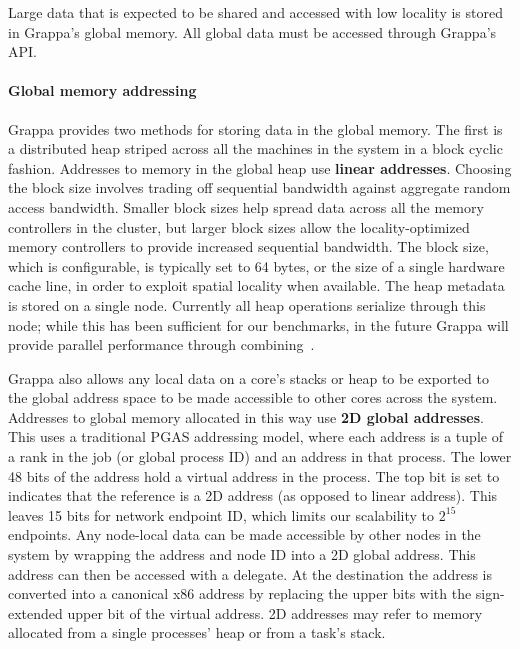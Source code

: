 Large data that is expected to be shared and accessed with low locality is stored in Grappa's global memory. All global data must be accessed through Grappa's API. %

\paragraph{Global memory addressing} Grappa provides two methods for storing data in the global memory. The first is a distributed heap striped across all the machines in the system in a block cyclic fashion.  Addresses to memory in the global heap use \textbf{linear addresses}.  Choosing the block size involves trading off sequential bandwidth against aggregate random access bandwidth. Smaller block sizes help spread data across all the memory controllers in the cluster, but larger block sizes allow the locality-optimized memory controllers to provide increased sequential bandwidth. The block size, which is configurable, is typically set to 64 bytes, or the size of a single hardware cache line, in order to exploit spatial locality when available. The heap metadata is stored on a single node. Currently all heap operations serialize through this node; while this has been sufficient for our benchmarks, in the future Grappa will provide parallel performance through combining~\cite{MAMA,flatcombining}.

Grappa also allows any local data on a core's stacks or heap to be exported to the global address space to be made accessible to other cores across the system. Addresses to global memory allocated in this way use \textbf{2D global addresses}.  This uses a traditional PGAS addressing model, where each address is a tuple of a rank in the job (or global process ID) and an address in that process. The lower 48 bits of the address hold a virtual address in the process. The top bit is set to indicates that the reference is a 2D address (as opposed to linear address). This leaves 15 bits for network endpoint ID, which limits our scalability to $2^{15}$ endpoints. Any node-local data can be made accessible by other nodes in the system by wrapping the address and node ID into a 2D global address. This address can then be accessed with a delegate.  At the destination the address is converted into a canonical x86 address by replacing the upper bits with the sign-extended upper bit of the virtual address. 2D addresses may refer to memory allocated from a single processes' heap or from a task's stack.

